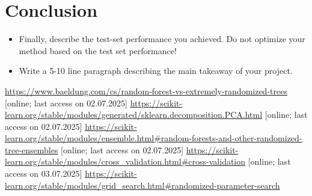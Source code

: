 \documentclass[a4, 10 pt, conference]{ieeeconf}  %
\begin{document}
\section{Conclusion}
\label{sec:con}

{\color{blue}

  \begin{itemize}
  \item Finally, describe the test-set performance you achieved. Do not
    optimize your method based on the test set performance!
  \item Write a 5-10 line paragraph describing the main takeaway of your project.
  \end{itemize}

}

\begin{thebibliography}{xxxx}
	 \url{https://www.baeldung.com/cs/random-forest-vs-extremely-randomized-trees} [online; last access on 02.07.2025]
	 \url{https://scikit-learn.org/stable/modules/generated/sklearn.decomposition.PCA.html} [online; last access on 02.07.2025]
	 \url{https://scikit-learn.org/stable/modules/ensemble.html#random-forests-and-other-randomized-tree-ensembles} [online; last access on 02.07.2025]
	 \url{https://scikit-learn.org/stable/modules/cross_validation.html#cross-validation} [online; last access on 03.07.2025]
	 \url{https://scikit-learn.org/stable/modules/grid_search.html#randomized-parameter-search}
\end{thebibliography}
\end{document}
